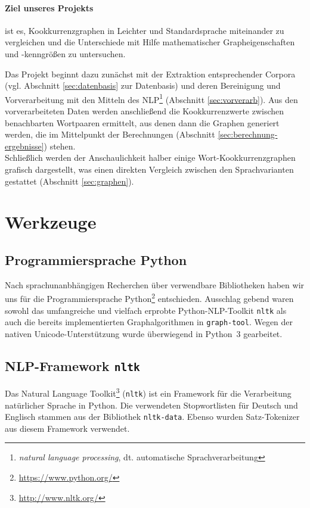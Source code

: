\documentclass[11pt, a4paper]{article}
\begin{document}
\paragraph{Ziel unseres Projekts} ist es, Kookkurrenzgraphen in Leichter und
Standardsprache miteinander zu vergleichen und die Unterschiede mit Hilfe
mathematischer Grapheigenschaften und -kenngrößen zu untersuchen.

Das Projekt beginnt dazu zunächst mit der Extraktion entsprechender Corpora
(vgl. Abschnitt \ref{sec:datenbasis} zur Datenbasis) und
deren Bereinigung und Vorverarbeitung mit den Mitteln des NLP\footnote{
\emph{natural language processing}, dt. automatische Sprachverarbeitung}
(Abschnitt \ref{sec:vorverarb}).
Aus den vorverarbeiteten Daten werden anschließend die Kookkurrenzwerte
zwischen benachbarten Wortpaaren ermittelt, aus denen
dann die Graphen generiert werden, die im Mittelpunkt der Berechnungen
(Abschnitt \ref{sec:berechnung-ergebnisse}) stehen.\\
Schließlich werden der Anschaulichkeit halber einige Wort-Kookkurrenzgraphen
grafisch dargestellt, was einen direkten Vergleich zwischen den Sprachvarianten
gestattet (Abschnitt \ref{sec:graphen}).


\section{Werkzeuge}

\subsection{Programmiersprache Python}
Nach sprachunanbhängigen Recherchen über verwendbare Bibliotheken haben wir uns
für die Programmiersprache Python\footnote{\url{https://www.python.org/}}
entschieden.
Ausschlag gebend waren sowohl das umfangreiche und vielfach erprobte
Python-NLP-Toolkit \texttt{nltk} als auch die bereits implementierten
Graphalgorithmen in \texttt{graph-tool}.
Wegen der nativen Unicode-Unterstützung wurde überwiegend in Python~3 gearbeitet.

\subsection{NLP-Framework \texttt{nltk}}
Das Natural Language Toolkit\footnote{\url{http://www.nltk.org/}} (\texttt{nltk}) ist
ein Framework f\"ur die Verarbeitung natürlicher Sprache in Python.
Die verwendeten Stopwortlisten für Deutsch und Englisch stammen aus der
Bibliothek \texttt{nltk-data}.
Ebenso wurden Satz-Tokenizer aus diesem Framework verwendet.
\end{document}
